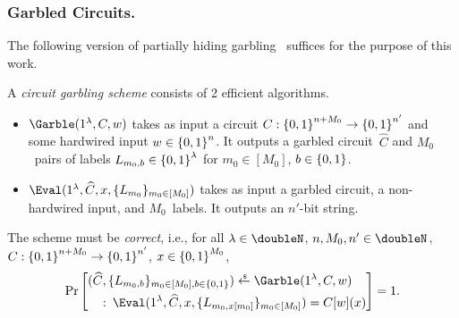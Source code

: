 \subsubsection{Garbled Circuits.}
The following version of partially hiding garbling~\cite{ICALP:IshWee14} suffices for the purpose of this work.

\begin{definition}\label{def:gc}
A \emph{circuit garbling scheme} consists of 2 efficient algorithms.
\begin{itemize}
\item $\Garble(1^\lambda,C,w)$
takes as input a circuit ${C:{\{0,1\}}^{n+M_0}\to{\{0,1\}}^{n'}}$ and some hardwired input ${w\in{\{0,1\}}^n}$.
It outputs a garbled circuit~$\widehat{C}$
and $M_0$~pairs of labels ${L_{m_0,b}\in{\{0,1\}}^\lambda}$
for ${m_0\in[M_0]}$, ${b\in{\{0,1\}}}$.
\item $\Eval(1^\lambda,\widehat{C},x,\{L_{m_0}\}_{m_0\in[M_0]})$
takes as input a garbled circuit, a non-hardwired input, and $M_0$~labels.
It outputs an $n'$-bit string.
\end{itemize}
The scheme must be \emph{correct}, i.e., for all
${\lambda\in\doubleN}$,
${n,M_0,n'\in\doubleN}$,%
${C:{\{0,1\}}^{n+M_0}\to{\{0,1\}}^{n'}}$,%
${x\in{\{0,1\}}^{M_0}}$,
\begin{align*}
\Pr\left[
\begin{aligned}
(\widehat{C},\{L_{m_0,b}\}_{m_0\in[M_0],b\in\bit})\draws\Garble(1^\lambda,{}&C,w)
\\\::\:
\Eval(1^\lambda,\widehat{C},x,\{L_{m_0,x[m_0]}\}_{m_0\in[M_0]})={}&C[w](x)
\end{aligned}
\right]=1.
\end{align*}
\end{definition}

